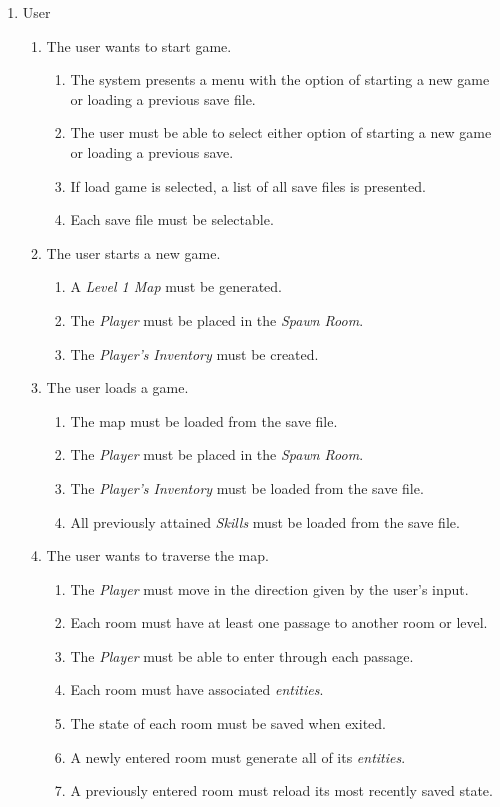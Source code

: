 \documentclass[12pt, titlepage]{article}
\begin{document}
\begin{enumerate}[{VP}1.]
  \item User 

  \begin{enumerate}[{BE1}.1]

    \item The user wants to start game.
    \begin{enumerate}
      \item The system presents a menu with the option of starting a new game or loading a previous save file.
      \item The user must be able to select either option of starting a new game or loading a previous save.
      \item If load game is selected, a list of all save files is presented.
      \item Each save file must be selectable.
    \end{enumerate}

    \item The user starts a new game.
    \begin{enumerate}
      \item A \textit{Level 1 Map} must be generated.
      \item The \textit{Player} must be placed in the \textit{Spawn Room}.
      \item The \textit{Player's} \textit{Inventory} must be created.
    \end{enumerate}

    \item The user loads a game.
    \begin{enumerate}
      \item The map must be loaded from the save file.
      \item The \textit{Player} must be placed in the \textit{Spawn Room}.
      \item The \textit{Player's Inventory} must be loaded from the save file.
      \item All previously attained \textit{Skills} must be loaded from the save file.
    \end{enumerate}

    \item The user wants to traverse the map.
    \begin{enumerate}
      \item The \textit{Player} must move in the direction given by the user's input.
      \item Each room must have at least one passage to another room or level.
      \item The \textit{Player} must be able to enter through each passage.
      \item Each room must have associated \textit{entities}.
      \item The state of each room must be saved when exited.
      \item A newly entered room must generate all of its \textit{entities}.
      \item A previously entered room must reload its most recently saved state.
    \end{enumerate}


\end{enumerate}
\end{enumerate}
\end{document}

